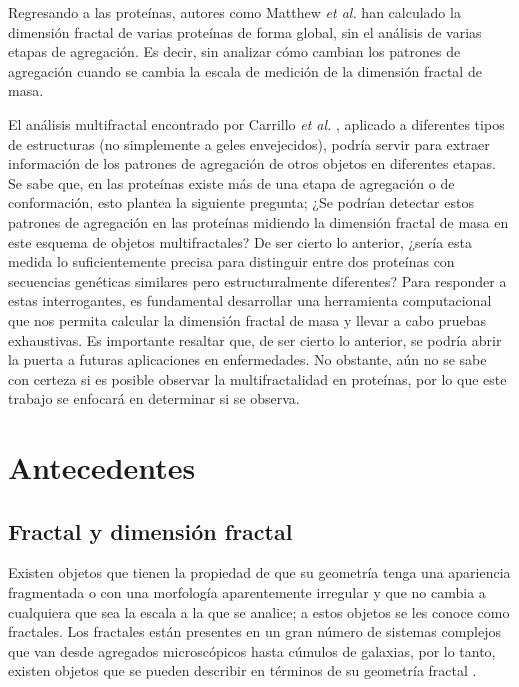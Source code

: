 \documentclass[11pt]{article}
\begin{document}
Regresando a las prote\'{i}nas, autores como Matthew \textit{et al.} \cite{Enright2005} han calculado la dimensi\'{o}n fractal de varias prote\'{i}nas de forma global, sin el an\'{a}lisis de varias etapas de agregaci\'{o}n. Es decir, sin analizar c\'{o}mo cambian los patrones de agregaci\'{o}n cuando se cambia la escala de medici\'{o}n de la dimensi\'{o}n fractal de masa.

El an\'{a}lisis multifractal encontrado por Carrillo \textit{et al.} \cite{Carrillo2003}, aplicado a diferentes tipos de estructuras (no simplemente a geles envejecidos), podr\'{i}a servir para extraer informaci\'{o}n de los patrones de agregaci\'{o}n de otros objetos en diferentes etapas. Se sabe que, en las prote\'{i}nas existe m\'{a}s de una etapa de agregaci\'{o}n o de conformaci\'{o}n, esto plantea la siguiente pregunta; ¿Se podr\'{i}an detectar estos patrones de agregaci\'{o}n en las prote\'{i}nas midiendo la dimensi\'{o}n fractal de masa en este esquema de objetos multifractales? De ser cierto lo anterior, ¿ser\'{i}a esta medida lo suficientemente precisa para distinguir entre dos prote\'{i}nas con secuencias gen\'{e}ticas similares pero estructuralmente diferentes? Para responder a estas interrogantes, es fundamental desarrollar una herramienta computacional que nos permita calcular la dimensi\'{o}n fractal de masa y llevar a cabo pruebas exhaustivas. Es importante resaltar que, de ser cierto lo anterior, se podr\'{i}a abrir la puerta a futuras aplicaciones en enfermedades. No obstante, a\'{u}n no se sabe con certeza si es posible observar la multifractalidad en prote\'{i}nas, por lo que este trabajo se enfocar\'{a} en determinar si se observa.


\section{Antecedentes}

\subsection{Fractal y dimensi\'{o}n fractal}
\label{subsec:subseccion2.1}


Existen objetos que tienen la propiedad de que su geometr\'{i}a tenga una apariencia fragmentada o con una morfolog\'{i}a aparentemente irregular y que no cambia a cualquiera que sea la escala a la que se analice; a estos objetos se les conoce como fractales. Los fractales est\'{a}n presentes en un gran n\'{u}mero de sistemas complejos que van desde agregados microsc\'{o}picos hasta c\'{u}mulos de galaxias, por lo tanto, existen objetos que se pueden describir en t\'{e}rminos de su geometr\'{i}a fractal \cite{Vicsek1992}. 
\end{document}
